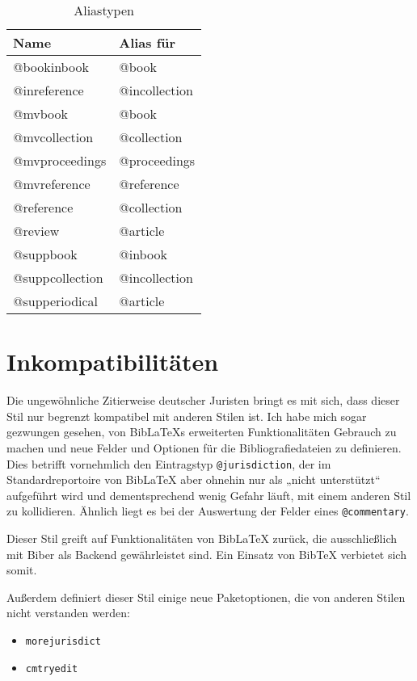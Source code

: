 \documentclass[11pt,a4paper,DIV=calc]{scrartcl}
\newcommand\software[1]{\textsf{#1}}
\newcommand\Biblatex{\software{Bib\LaTeX{}}\xspace}
\begin{document}
\begin{table}
  \centering
  \begin{tabular}{ll}
    \textbf{Name} & \textbf{Alias für}\\
    \hline
    @bookinbook     & @book\\
    @inreference    & @incollection\\
    @mvbook         & @book\\
    @mvcollection   & @collection\\
    @mvproceedings  & @proceedings\\
    @mvreference    & @reference\\
    @reference      & @collection\\
    @review         & @article\\
    @suppbook       & @inbook\\
    @suppcollection & @incollection\\
    @supperiodical  & @article
  \end{tabular}
  \caption{Aliastypen}
  \label{tab:aliastypen}
\end{table}

\section{Inkompatibilitäten}\label{sec:inkompat}

Die ungewöhnliche Zitierweise deutscher Juristen bringt es mit sich,
dass dieser Stil nur begrenzt kompatibel mit anderen Stilen ist. Ich
habe mich sogar gezwungen gesehen, von \Biblatex{}s erweiterten
Funktionalitäten Gebrauch zu machen und neue Felder und Optionen für
die Bibliografiedateien zu definieren. Dies betrifft vornehmlich den
Eintragstyp \verb+@jurisdiction+, der im Standardreportoire von
\Biblatex aber ohnehin nur als „nicht unterstützt“ aufgeführt wird und
dementsprechend wenig Gefahr läuft, mit einem anderen Stil zu
kollidieren. Ähnlich liegt es bei der Auswertung der Felder eines
\verb+@commentary+.

Dieser Stil greift auf Funktionalitäten von \Biblatex zurück, die
ausschließlich mit \software{Biber} als Backend gewährleistet
sind. Ein Einsatz von \software{Bib\TeX{}} verbietet sich somit.

Außerdem definiert dieser Stil einige neue Paketoptionen, die von
anderen Stilen nicht verstanden werden:

\begin{itemize}
\item \verb+morejurisdict+
\item \verb+cmtryedit+
\end{itemize}
\end{document}
